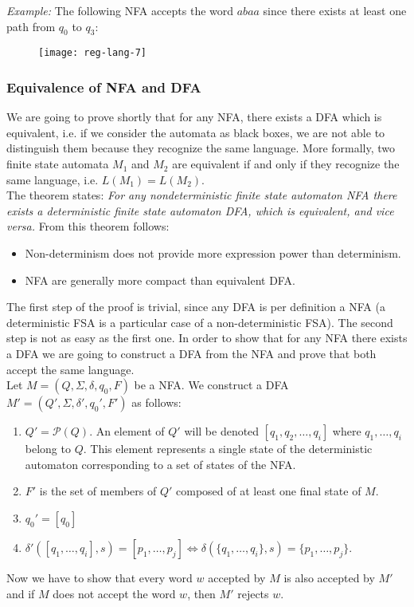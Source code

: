 \textit{Example:} The following NFA accepts the word $abaa$
since there exists at least one path from $q_0$ to $q_3$:
\begin{figure}[H]
  \centering
  \texttt{[image: reg-lang-7]}
\end{figure}

\subsubsection{Equivalence of NFA and DFA}
We are going to prove shortly that for any NFA,
there exists a DFA which is equivalent, i.e. if
we consider the automata as black boxes,
we are not able to distinguish them
because they recognize the same language.
More formally, two finite state automata
$M_1$ and $M_2$ are equivalent if and only if they
recognize the same language, i.e. $L(M_1) = L(M_2)$.\\

The theorem states: \textit{For any nondeterministic finite state automaton NFA there exists a deterministic finite state automaton DFA, which is equivalent, and vice versa.}
From this theorem follows:
\begin{itemize}
  \item Non-determinism does not provide more expression power than determinism.
  \item NFA are generally more compact than equivalent DFA.
\end{itemize}
The first step of the proof is trivial, since any 
DFA is per definition a NFA (a deterministic FSA is a particular
case of a non-deterministic FSA).
The second step is not as easy as the first one.
In order to show that for any NFA there exists a 
DFA we are going to construct a DFA from the NFA and prove that both accept the same language.\\

Let $M = (Q, \Sigma, \delta, q_0, F)$ be a NFA. 
We construct a DFA $M' = (Q', \Sigma, \delta', q_0', F')$ as follows:
\begin{enumerate}
  \item $Q' = \mathcal{P}(Q)$. An element of $Q'$ will be denoted $[q_1,q_2,\dots,q_i]$
  where $q_1,\dots,q_i$ belong to $Q$. This element represents a single state of the deterministic automaton corresponding to a set of states of the NFA.
  \item $F'$ is the set of members of $Q'$ composed of at least one final state of $M$.
  \item $q_0' = [q_0]$
  \item $\delta'([q_1, \dots, q_i], s) = [p_1,\dots,p_j] \Longleftrightarrow \delta(\{q_1,\dots,q_i\}, s) = \{p_1,\dots,p_j\}$.
\end{enumerate}
Now we have to show that every word $w$ accepted by $M$ is also accepted by $M'$
and if $M$ does not accept the word $w$, then $M'$ rejects $w$.\\

